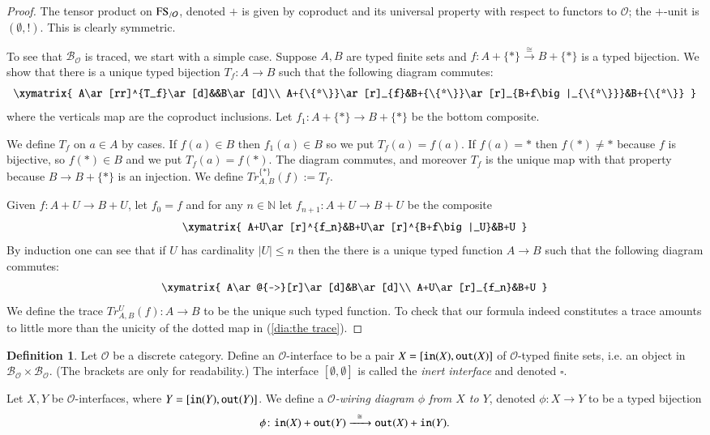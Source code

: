 \documentclass{amsart}
\def\tn{\textnormal}
\def\mc{\mathcal}
\def\NN{{\mathbb N}}
\def\singleton{{\{*\}}}
\def\to{\rightarrow}
\def\taking{\colon}
\def\iso{\cong}
\newcommand{\To}[1]{\xrightarrow{#1}}
\newcommand{\Too}[1]{\xrightarrow{\ \ #1\ \ }}
\def\mcB{\mc{B}}
\def\mcO{\mc{O}}
\newcommand{\inp}[1]{{\tt in}(#1)}
\newcommand{\outp}[1]{{\tt out}(#1)}
\newcommand{\FS}[1]{\tn{FS}_{/\mathcal{#1}}}
\newcommand{\Bij}[1]{\mcB_{\mathcal{#1}}}
\theoremstyle{remark}
\theoremstyle{definition}
\newtheorem{definition}[subsubsection]{Definition}
\begin{document}
\begin{proof}

The tensor product on $\FS{O}$, denoted $+$ is given by coproduct and its universal property with respect to functors to $\mcO$; the $+$-unit is $(\emptyset,!)$. This is clearly symmetric. 

To see that $\Bij{O}$ is traced, we start with a simple case. Suppose $A,B$ are typed finite sets and $f\taking A+\singleton\To{\iso} B+\singleton$ is a typed bijection. We show that there is a unique typed bijection $T_f\taking A\to B$ such that the following diagram commutes: 
$$\xymatrix{
A\ar[rr]^{T_f}\ar[d]&&B\ar[d]\\
A+\singleton\ar[r]_{f}&B+\singleton\ar[r]_{B+f\big|_\singleton}&B+\singleton
}
$$
where the verticals map are the coproduct inclusions. Let $f_1\taking A+\singleton\to B+\singleton$ be the bottom composite. 

We define $T_f$ on $a\in A$ by cases. If $f(a)\in B$ then $f_1(a)\in B$ so we put $T_f(a)=f(a)$. If $f(a)=*$ then $f(*)\neq *$ because $f$ is bijective, so $f(*)\in B$ and we put $T_f(a)=f(*)$. The diagram commutes, and moreover $T_f$ is the unique map with that property because $B\to B+\singleton$ is an injection. We define $Tr^{\singleton}_{A,B}(f):=T_f$.

Given $f\taking A+U\to B+U$, let $f_0=f$ and for any $n\in\NN$ let $f_{n+1}\taking A+U\to B+U$ be the composite
$$\xymatrix{
A+U\ar[r]^{f_n}&B+U\ar[r]^{B+f\big|_U}&B+U
}
$$
By induction one can see that if $U$ has cardinality $|U|\leq n$ then the there is a unique typed function $A\to B$ such that the following diagram commutes:
\begin{align}\label{dia:the trace}
\xymatrix{
A\ar@{-->}[r]\ar[d]&B\ar[d]\\
A+U\ar[r]_{f_n}&B+U
}
\end{align}
We define the trace $Tr^U_{A,B}(f)\taking A\to B$ to be the unique such typed function. To check that our formula indeed constitutes a trace amounts to little more than the unicity of the dotted map in (\ref{dia:the trace}). 

\end{proof}

\begin{definition}

Let $\mcO$ be a discrete category. Define an $\mcO$-interface to be a pair $X=[\inp{X},\outp{X}]$ of $\mcO$-typed finite sets, i.e. an object in $\Bij{O}\times\Bij{O}$. (The brackets are only for readability.) The interface $[\emptyset,\emptyset]$ is called the {\em inert interface} and denoted $\square$. 

Let $X,Y$ be $\mcO$-interfaces, where $Y=[\inp{Y},\outp{Y}]$. We define a {\em $\mcO$-wiring diagram $\phi$ from $X$ to $Y$}, denoted $\phi\taking X\to Y$ to be a typed bijection 
$$\phi\taking\inp{X}+\outp{Y}\Too{\iso}\outp{X}+\inp{Y}.$$

\end{definition}
\end{document}
